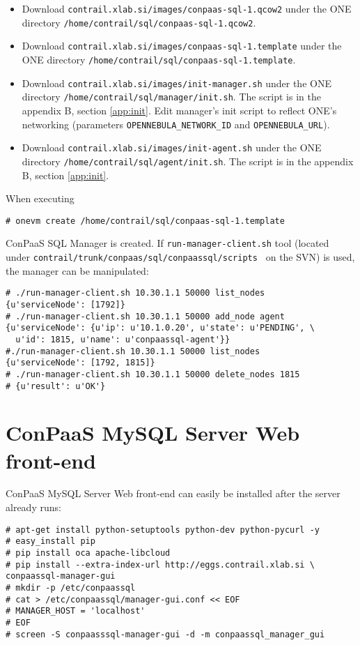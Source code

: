 \documentclass[a4paper,10pt]{article}
\begin{document}
\begin{itemize}
	\item Download {\tt contrail.xlab.si/images/conpaas-sql-1.qcow2} under the ONE directory {\tt /home/contrail/sql/conpaas-sql-1.qcow2}.
	\item Download {\tt contrail.xlab.si/images/conpaas-sql-1.template} under the ONE directory {\tt /home/contrail/sql/conpaas-sql-1.template}.
	\item Download {\tt contrail.xlab.si/images/init-manager.sh} under the ONE directory {\tt /home/contrail/sql/manager/init.sh}. The script is in the appendix B, section \ref{app:init}. Edit manager's init script to reflect ONE's networking (parameters {\tt OPENNEBULA\_NETWORK\_ID} and {\tt OPENNEBULA\_URL}).
	\item Download {\tt contrail.xlab.si/images/init-agent.sh} under the ONE directory {\tt /home/contrail/sql/agent/init.sh}. The script is in the appendix B, section \ref{app:init}.
\end{itemize}

When executing
\begin{Verbatim}[frame=single]
# onevm create /home/contrail/sql/conpaas-sql-1.template
\end{Verbatim}

ConPaaS SQL Manager is created. If {\tt run-manager-client.sh} tool (located under {\tt contrail/trunk/conpaas/sql/conpaassql/scripts } on the SVN) is used, the manager can be manipulated:

\begin{Verbatim}[frame=single]
# ./run-manager-client.sh 10.30.1.1 50000 list_nodes
{u'serviceNode': [1792]}
# ./run-manager-client.sh 10.30.1.1 50000 add_node agent
{u'serviceNode': {u'ip': u'10.1.0.20', u'state': u'PENDING', \
  u'id': 1815, u'name': u'conpaassql-agent'}}
#./run-manager-client.sh 10.30.1.1 50000 list_nodes
{u'serviceNode': [1792, 1815]}
# ./run-manager-client.sh 10.30.1.1 50000 delete_nodes 1815
# {u'result': u'OK'}
\end{Verbatim}

\section{ConPaaS MySQL Server Web front-end}
\label{sec:web-front-end}
ConPaaS MySQL Server Web front-end can easily be installed after the server already runs: 

\begin{Verbatim}[frame=single]
# apt-get install python-setuptools python-dev python-pycurl -y
# easy_install pip
# pip install oca apache-libcloud
# pip install --extra-index-url http://eggs.contrail.xlab.si \
conpaassql-manager-gui
# mkdir -p /etc/conpaassql
# cat > /etc/conpaassql/manager-gui.conf << EOF
# MANAGER_HOST = 'localhost'
# EOF
# screen -S conpaasssql-manager-gui -d -m conpaassql_manager_gui
\end{Verbatim}
\end{document}
